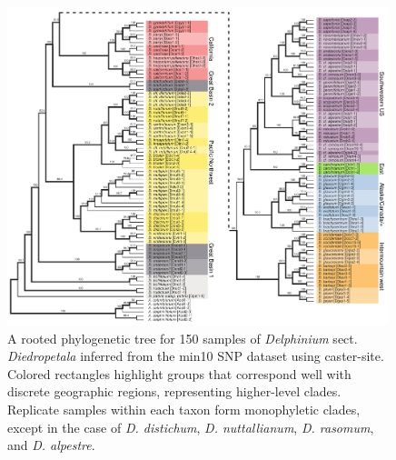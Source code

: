 \documentclass[11pt]{article}
\begin{document}


\begin{figure}[t!]
	\centering
	  \includegraphics[width=0.99\textwidth]{./figures/caster-trees.pdf}	
	\caption{
		A rooted phylogenetic tree for 150 samples of \emph{Delphinium} sect. \emph{Diedropetala}
		inferred from the min10 SNP dataset using caster-site. Colored rectangles highlight
		groups that correspond well with discrete geographic regions, representing higher-level 
		clades. Replicate samples within each taxon form monophyletic clades, except in the case
		of \emph{D. distichum}, \emph{D. nuttallianum}, \emph{D. rasomum}, and \emph{D. alpestre}.
	}
	\label{fig:bigtree}
\end{figure}
\end{document}
